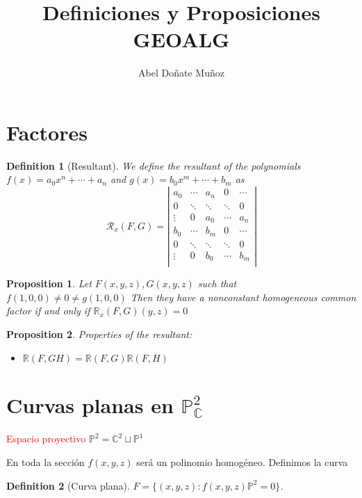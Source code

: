 \documentclass[leqno]{article}
\title{Definiciones y Proposiciones GEOALG}
\author{Abel Doñate Muñoz}
\date{}
\newtheorem*{proposition}{Proposition}
\newtheorem*{definition}{Definition}
\newcommand{\com}[1]{\textcolor{red}{#1}}
\begin{document}
\maketitle
\tableofcontents
\newpage

\section{Factores}

\begin{definition}[Resultant] We define the resultant of the polynomials $f(x) = a_0x^n + \cdots + a_n$ and $ g(x) = b_0x^m + \cdots + b_m$ as
   \[
	 \mathcal{R}_x(F, G) = \left| \begin{matrix} 
	   a_0 & \cdots & a_n & 0 & \cdots \\
	   0 & \ddots & \ddots & \ddots & 0\\
	   \vdots & 0 & a_0 & \cdots & a_n \\
	   b_0 & \cdots & b_m & 0 & \cdots \\
	   0 & \ddots & \ddots & \ddots & 0\\
	   \vdots & 0 & b_0 & \cdots & b_m \\
	 \end{matrix}  \right|
  \] 
\end{definition}

\begin{proposition} Let $F(x, y, z), G(x, y, z)$ such that $f(1, 0, 0) \neq 0\neq g(1, 0, 0)$ Then they have a nonconstant homogeneous common factor if and only if $\mathbb{R}_x(F, G) (y, z) =0$
\end{proposition}

\begin{proposition}Properties of the resultant:
  \begin{itemize}[topsep=-6pt, itemsep=0pt]
    \item $\mathbb{R}(F, GH) = \mathbb{R}(F, G) \mathbb{R}(F, H)$
  \end{itemize}
\end{proposition}

\section{Curvas planas en $\mathbb{P}_{\mathbb{C}}^2$}

\com{Espacio proyectivo} $\mathbb{P}^2 = \mathbb{C}^2 \sqcup \mathbb{P}^1 $

En toda la sección $f(x, y, z)$ será un polinomio homogéneo. Definimos la curva 
\begin{definition}[Curva plana] $F=\{(x, y, z): f(x, y, z) \mathbb{P}^2 = 0\}$.
\end{definition}
\end{document}
